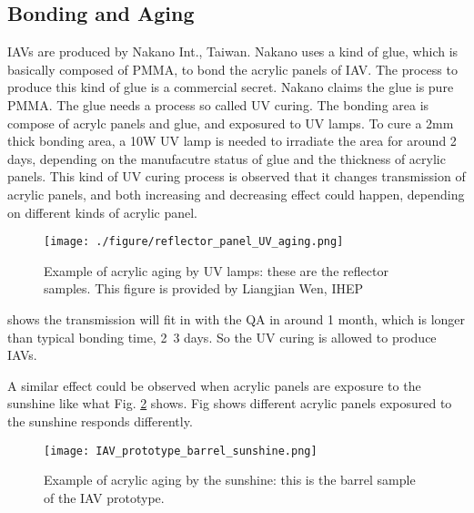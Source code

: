 \subsection {Bonding and Aging}

IAVs are produced by Nakano Int., Taiwan. Nakano uses a kind of glue, which is basically
composed of PMMA, to bond the acrylic panels of IAV. The process to produce this kind of glue is a commercial
secret. Nakano claims the glue is pure PMMA. The glue needs a process so called UV curing. The bonding area
is compose of acrylc panels and glue, and exposured to UV lamps. To cure a 2mm thick bonding
area, a 10W UV lamp is needed to irradiate the area for around 2 days, depending on the manufacutre status of glue
and the thickness of acrylic panels. This kind of UV curing process is observed that it changes transmission of acrylic panels,
and both increasing and decreasing effect could happen, depending on different kinds of acrylic panel.


\begin{figure}
    \centering
    \texttt{[image: ./figure/reflector\_panel\_UV\_aging.png]}
    \caption [Example of acrylic aging by UV lamps]
    {Example of acrylic aging by UV lamps: these are the reflector samples. This figure is provided by Liangjian Wen, IHEP}
    \label{ReflectorAging}
    \end{figure}







shows the transmission will fit in with the QA in around 1 month, which is longer than typical
bonding time, 2~3 days. So the UV curing is allowed to produce IAVs.

A similar effect could be observed when acrylic panels are exposure to the sunshine like what
Fig. \ref{IAVPrototypeBarrelSunshineAging} shows. Fig shows different
acrylic panels exposured to the sunshine responds differently.


\begin{figure}
    \centering
    \texttt{[image: IAV\_prototype\_barrel\_sunshine.png]}
    \caption{Example of acrylic aging by the sunshine: this is the barrel sample of the IAV prototype.}
    \label{IAVPrototypeBarrelSunshineAging}
    \end{figure}


